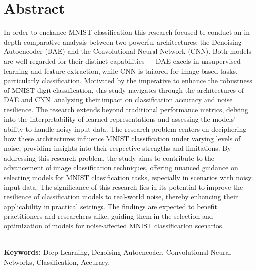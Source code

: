 \chapter*{\center \Large  Abstract}

In order to enchance MNIST classification this research focused to conduct an in-depth comparative analysis between two powerful architectures: the Denoising Autoencoder (DAE) and the Convolutional Neural Network (CNN). Both models are well-regarded for their distinct capabilities — DAE excels in unsupervised learning and feature extraction, while CNN is tailored for image-based tasks, particularly  classification. Motivated by the imperative to enhance the robustness of MNIST digit classification, this study navigates through the architectures of DAE and CNN, analyzing their impact on classification accuracy and noise resilience. The research extends beyond traditional performance metrics, delving into the interpretability of learned representations and assessing the models' ability to handle noisy input data. The research problem centers on deciphering how these architectures influence MNIST classification under varying levels of noise, providing insights into their respective strengths and limitations.  By addressing this research problem, the study aims to contribute to the advancement of image classification techniques, offering nuanced guidance on selecting models for MNIST classification tasks, especially in scenarios with noisy input data. The significance of this research lies in its potential to improve the resilience of classification models to real-world noise, thereby enhancing their applicability in practical settings. The findings are expected to benefit practitioners and researchers alike, guiding them in the selection and optimization of models for noise-affected MNIST classification scenarios.


~\\[1cm]
\noindent %
\textbf{Keywords:} Deep Learning, Denoising Autoencoder,
Convolutional Neural Networks, Classification, Accuracy.